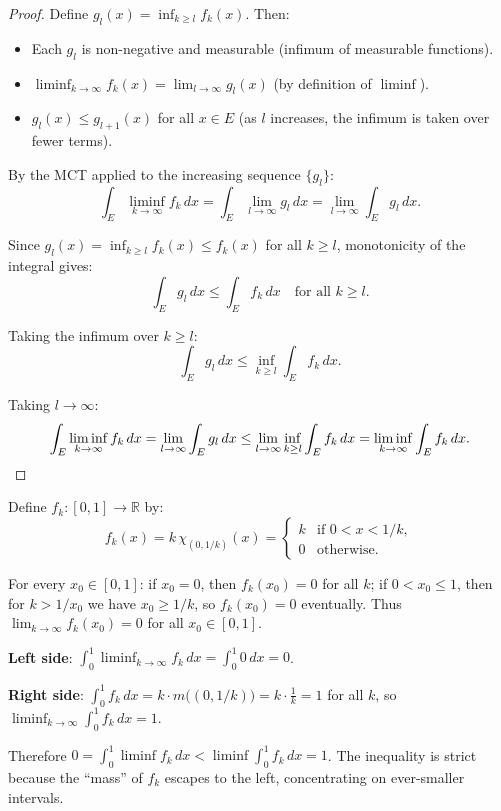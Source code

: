 \documentclass[11pt]{report}
\begin{document}
\begin{proof}
Define $g_l(x) = \inf_{k \geq l} f_k(x)$. Then:
\begin{itemize}
\item Each $g_l$ is non-negative and measurable (infimum of measurable functions).
\item $\liminf_{k \to \infty} f_k(x) = \lim_{l \to \infty} g_l(x)$ (by definition of $\liminf$).
\item $g_l(x) \leq g_{l+1}(x)$ for all $x \in E$ (as $l$ increases, the infimum is taken over fewer terms).
\end{itemize}

By the MCT applied to the increasing sequence $\{g_l\}$:
\[
\int_E \liminf_{k \to \infty} f_k\,dx = \int_E \lim_{l \to \infty} g_l\,dx = \lim_{l \to \infty} \int_E g_l\,dx.
\]

Since $g_l(x) = \inf_{k \geq l} f_k(x) \leq f_k(x)$ for all $k \geq l$, monotonicity of the integral gives:
\[
\int_E g_l\,dx \leq \int_E f_k\,dx \quad \text{for all } k \geq l.
\]

Taking the infimum over $k \geq l$:
\[
\int_E g_l\,dx \leq \inf_{k \geq l} \int_E f_k\,dx.
\]

Taking $l \to \infty$:
\[
\int_E \liminf_{k \to \infty} f_k\,dx = \lim_{l \to \infty} \int_E g_l\,dx \leq \lim_{l \to \infty} \inf_{k \geq l} \int_E f_k\,dx = \liminf_{k \to \infty} \int_E f_k\,dx. \qedhere
\]
\end{proof}

\begin{exbox}
Define $f_k: [0, 1] \to \mathbb{R}$ by:
\[
f_k(x) = k\,\chi_{(0, 1/k)}(x) = \begin{cases} k & \text{if } 0 < x < 1/k, \\ 0 & \text{otherwise.} \end{cases}
\]

For every $x_0 \in [0, 1]$: if $x_0 = 0$, then $f_k(x_0) = 0$ for all $k$; if $0 < x_0 \leq 1$, then for $k > 1/x_0$ we have $x_0 \geq 1/k$, so $f_k(x_0) = 0$ eventually. Thus $\lim_{k \to \infty} f_k(x_0) = 0$ for all $x_0 \in [0,1]$.

\textbf{Left side}: $\int_0^1 \liminf_{k \to \infty} f_k\,dx = \int_0^1 0\,dx = 0$.

\textbf{Right side}: $\int_0^1 f_k\,dx = k \cdot m\!\bigl((0, 1/k)\bigr) = k \cdot \frac{1}{k} = 1$ for all $k$, so $\liminf_{k \to \infty} \int_0^1 f_k\,dx = 1$.

Therefore $0 = \int_0^1 \liminf f_k\,dx < \liminf \int_0^1 f_k\,dx = 1$. The inequality is strict because the ``mass'' of $f_k$ escapes to the left, concentrating on ever-smaller intervals.
\end{exbox}
\end{document}
